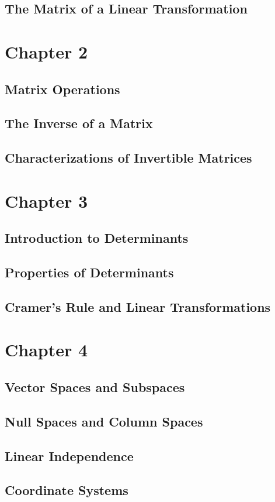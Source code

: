 \documentclass{article}
\begin{document}
\subsection{The Matrix of a Linear Transformation}
\section{Chapter 2}
\subsection{Matrix Operations}
\subsection{The Inverse of a Matrix}
\subsection{Characterizations of Invertible Matrices}
\section{Chapter 3}
\subsection{Introduction to Determinants}
\subsection{Properties of Determinants}
\subsection{Cramer's Rule and Linear Transformations}
\section{Chapter 4}
\subsection{Vector Spaces and Subspaces}
\subsection{Null Spaces and Column Spaces}
\subsection{Linear Independence}
\subsection{Coordinate Systems}
\end{document}
